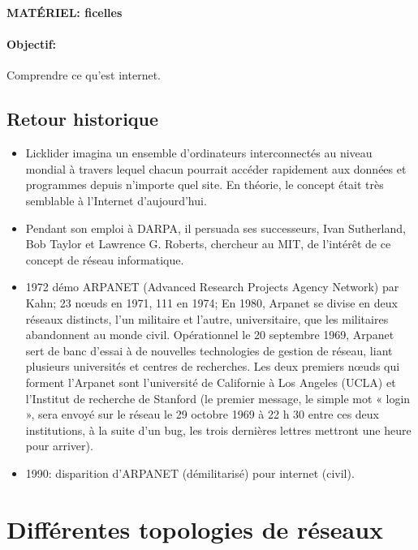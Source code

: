 \documentclass[a4paper,11pt]{article}
\begin{document}
\begin{Form}
\begin{commentprof}
\textbf{MATÉRIEL: ficelles}
\end{commentprof}
\paragraph{Objectif:} Comprendre ce qu'est internet.
\begin{commentprof}
\section*{Retour historique}
\begin{itemize}
\item Licklider imagina un ensemble d’ordinateurs interconnectés au niveau mondial à travers lequel chacun pourrait accéder rapidement aux données et programmes depuis n’importe quel site. En théorie, le concept était très semblable à l’Internet d’aujourd’hui. 
\item Pendant son emploi à DARPA, il persuada ses successeurs, Ivan Sutherland, Bob Taylor et Lawrence G. Roberts, chercheur au MIT, de l’intérêt de ce concept de réseau informatique.
\item 1972 démo ARPANET (Advanced Research Projects Agency Network) par Kahn; 23 nœuds en 1971, 111 en 1974; En 1980, Arpanet se divise en deux réseaux distincts, l'un militaire et l'autre, universitaire, que les militaires abandonnent au monde civil. Opérationnel le 20 septembre 1969, Arpanet sert de banc d'essai à de nouvelles technologies de gestion de réseau, liant plusieurs universités et centres de recherches. Les deux premiers nœuds qui forment l'Arpanet sont l'université de Californie à Los Angeles (UCLA) et l'Institut de recherche de Stanford (le premier message, le simple mot « login », sera envoyé sur le réseau le 29 octobre 1969 à 22 h 30 entre ces deux institutions, à la suite d'un bug, les trois dernières lettres mettront une heure pour arriver).
\item 1990: disparition d'ARPANET (démilitarisé) pour internet (civil).
\end{itemize}
\end{commentprof}
\section{Différentes topologies de réseaux}

\end{Form}
\end{document}
